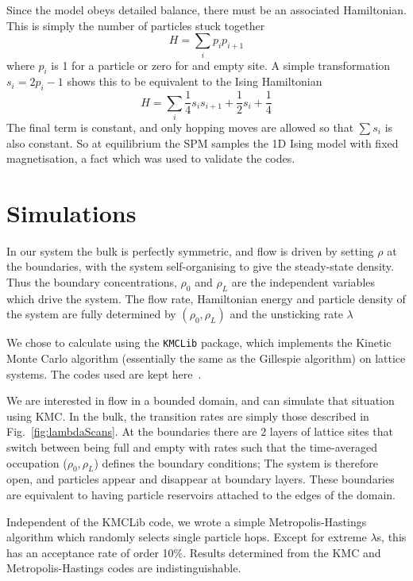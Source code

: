 \documentclass[
reprint, amsmath,amssymb, aps,
]{revtex4-1}
\begin{document}
Since the model obeys detailed balance, there must be an associated
Hamiltonian.  This is simply the number of particles stuck together
\[ H = \sum_i p_ip_{i+1} \]
where $p_i$ is 1 for a particle or zero for and empty site.  A simple
transformation $s_i = 2p_i-1$ shows this to be equivalent to the Ising
Hamiltonian
\[ H = \sum_i \frac{1}{4} s_is_{i+1} + \frac{1}{2} s_i + \frac{1}{4}\]
The final term is constant, and only hopping moves are allowed so that
$\sum s_i$ is also constant. So at equilibrium the SPM samples the 1D
Ising model with fixed magnetisation, a fact which was used to
validate the codes.


\section{Simulations}

 In our system the bulk is perfectly symmetric, and flow is driven by
 setting $\rho$ at the boundaries, with the system self-organising to
 give the steady-state density. Thus the boundary concentrations,
 $\rho_0$ and $\rho_L$ are the independent variables which drive the
 system.  The flow rate, Hamiltonian energy and particle density of the system are fully determined by  $(\rho_0, \rho_L)$ and the unsticking rate $\lambda$


  We chose to calculate using the \texttt{KMCLib}\cite{leetmaa2014kmclib}
 package, which implements the Kinetic Monte Carlo algorithm
 (essentially the same as the Gillespie algorithm\cite{Gillespie1977,
   Bortz1975, Prados1997}) on lattice systems. The codes used are kept
 here~\cite{jHellGitRepo}.

We are interested in flow in a bounded domain, and can simulate that
situation using KMC. In the bulk, the transition rates are simply
those described in Fig.~\ref{fig:lambdaScans}. At the boundaries there
are 2 layers of lattice sites that switch between being full and empty
with rates such that the time-averaged occupation ($\rho_0, \rho_L$)
defines the boundary conditions; The system is therefore open, and
particles appear and disappear at boundary layers.  These boundaries
are equivalent to having particle reservoirs attached to the edges of the
domain.

Independent of the KMCLib code, we wrote a simple Metropolis-Hastings
algorithm which randomly selects single particle hops.  Except for
extreme $\lambda$s, this has an acceptance rate of order 10\%. Results
determined from the KMC and Metropolis-Hastings codes are
indistinguishable.
\end{document}
